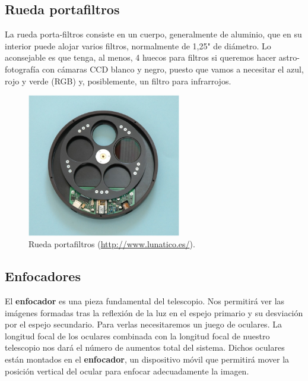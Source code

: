 \subsection{Rueda portafiltros}

La rueda porta-filtros consiste en un cuerpo, generalmente de aluminio, que en su interior puede alojar varios filtros, normalmente de 1,25" de diámetro. Lo aconsejable es que tenga, al menos, 4 huecos para filtros si queremos hacer astro-fotografía con cámaras CCD blanco y negro, puesto que vamos a necesitar el azul, rojo y verde (RGB) y, posiblemente, un filtro para infrarrojos.

\bigskip
\begin{figure}[!ht]
  \begin{center}
  \includegraphics[width=0.6\textwidth]{../images/portafiltros.jpg}
  \caption[Rueda portafiltros]{Rueda portafiltros (\href{http://www.lunatico.es/}{http://www.lunatico.es/}).}
  \label{fig:diag_scrum}
  \end{center}
\end{figure}

\subsection{Enfocadores}

El \textbf{enfocador} es una pieza fundamental del telescopio. Nos permitirá ver las imágenes formadas tras la reflexión de la luz en el espejo primario y su desviación por el espejo secundario. Para verlas necesitaremos un juego de oculares. La longitud focal de los oculares combinada con la longitud focal de nuestro telescopio nos dará el número de aumentos total del sistema. Dichos oculares están montados en el \textbf{enfocador}, un dispositivo móvil que permitirá mover la posición vertical del ocular para enfocar adecuadamente la imagen.

